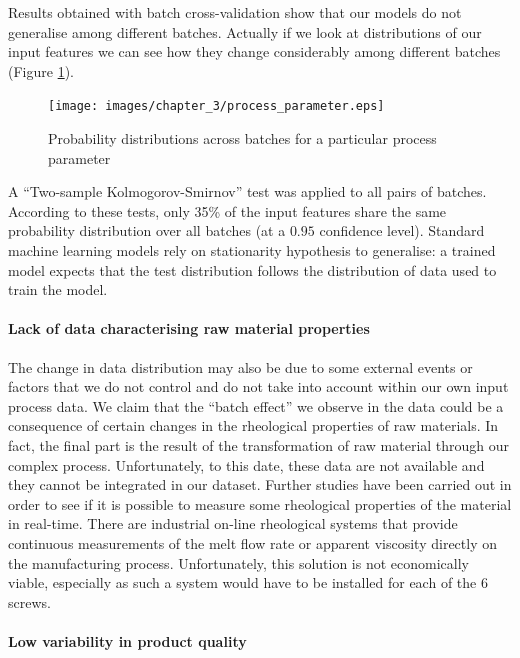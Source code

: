 Results obtained with batch cross-validation show that our models do not generalise among different batches. Actually if we look at distributions of our input features we can see how they change considerably among different batches (Figure \ref{fig:Example of a process parameter variability in probability distribution}). 
%
\begin{figure}
\centerline{\texttt{[image: images/chapter\_3/process\_parameter.eps]}}
\caption{Probability distributions across batches for a particular process parameter}
\label{fig:Example of a process parameter variability in probability distribution}
\end{figure}
%
A “Two-sample Kolmogorov-Smirnov” test was applied to all pairs of batches. According to these tests, only 35\% of the input features share the same probability distribution over all batches (at a $0.95$ confidence level).
Standard machine learning models rely on stationarity hypothesis to generalise: a trained model expects that the test distribution follows the distribution of data used to train the model.

\paragraph{Lack of data characterising raw material properties}

The change in data distribution may also be due to some external events or factors that we do not control and do not take into account within our own input process data. We claim that the ``batch effect'' we observe in the data could be a consequence of certain changes in the rheological properties of raw materials. In fact, the final part is the result of the transformation of raw material through our complex process. Unfortunately, to this date, these data are not available and they cannot be integrated in our dataset. Further studies have been carried out in order to see if it is possible to measure some rheological properties of the material in real-time. There are industrial on-line rheological systems that provide continuous measurements of the melt flow rate or apparent viscosity directly on the manufacturing process. Unfortunately, this solution is not economically viable, especially as such a system would have to be installed for each of the 6 screws.

\paragraph{Low variability in product quality}

